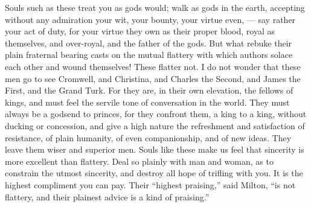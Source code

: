 \documentclass{article}
\begin{document}
Souls such as these treat you as gods would; walk as gods in the earth, accepting without any admiration your wit, your bounty, your virtue even, --- say rather your act of duty, for your virtue they own as their proper blood, royal as themselves, and over-royal, and the father of the gods. But what rebuke their plain fraternal bearing casts on the mutual flattery with which authors solace each other and wound themselves! These flatter not. I do not wonder that these men go to see Cromwell, and Christina, and Charles the Second, and James the First, and the Grand Turk. For they are, in their own elevation, the fellows of kings, and must feel the servile tone of conversation in the world. They must always be a godsend to princes, for they confront them, a king to a king, without ducking or concession, and give a high nature the refreshment and satisfaction of resistance, of plain humanity, of even companionship, and of new ideas. They leave them wiser and superior men. Souls like these make us feel that sincerity is more excellent than flattery. Deal so plainly with man and woman, as to constrain the utmost sincerity, and destroy all hope of trifling with you. It is the highest compliment you can pay. Their ``highest praising,'' said Milton, ``is not flattery, and their plainest advice is a kind of praising.''
\end{document}
